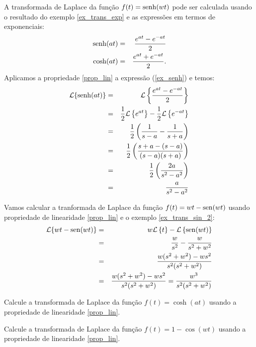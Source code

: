 \begin{ex} A transformada de Laplace da função $f(t)=\operatorname{senh}(wt)$ pode ser calculada usando o resultado do exemplo \ref{ex_trans_exp} e as expressões em termos de exponenciais:
\begin{eqnarray}
{\label{ex_senh}} \operatorname{senh}(at)&=&\frac{e^{at}-e^{-at}}{2}\\
{\label{ex_cosh}} \cosh(at)&=&\frac{e^{at}+e^{-at}}{2}.
\end{eqnarray} 
Aplicamos a propriedade \ref{prop_lin} a expressão (\ref{ex_senh}) e temos:
\begin{eqnarray*}
\mathcal{L }\{\operatorname{senh}(at)\}&=&\mathcal{L }\left\{\frac{e^{at}-e^{-at}}{2}\right\}\\
&=&\frac{1}{2} \mathcal{L }\left\{ e^{at}\right\}-\frac{1}{2} \mathcal{L }\left\{ e^{-at}\right\}\\
&=&\frac{1}{2}\left( \frac{1}{s-a}- \frac{1}{s+a}\right)\\
&=&\frac{1}{2}\left( \frac{s+a-(s-a)}{(s-a)(s+a)}\right)\\
&=&\frac{1}{2}\left( \frac{2a}{s^2-a^2}\right)\\
&=&\frac{a}{s^2-a^2}
\end{eqnarray*} 
\end{ex}

\begin{ex}Vamos calcular a tranformada de Laplace da função $f(t)=wt-\operatorname{sen}(wt)$ usando propriedade de linearidade \ref{prop_lin} e o exemplo \ref{ex_trans_sin_2}:
\begin{eqnarray*}
\mathcal{L }\{wt-\operatorname{sen}(wt)\}&=& w\mathcal{L }\left\{ t\right\}- \mathcal{L }\left\{ \operatorname{sen}(wt)\right\}\\
&=&\frac{w}{s^2}-\frac{w}{s^2+w^2}\\
&=&\frac{w(s^2+w^2)-ws^2}{s^2(s^2+w^2)}\\
&=&\frac{w(s^2+w^2)-ws^2}{s^2(s^2+w^2)}=\frac{w^3}{s^2(s^2+w^2)}\\
\end{eqnarray*} 
\end{ex}

\begin{prob}Calcule a transformada de Laplace da função $f(t)=\cosh(at)$ usando a propriedade de linearidade \ref{prop_lin}. 
\end{prob}
\begin{prob}Calcule a transformada de Laplace da função $f(t)=1-\cos(wt)$ usando a propriedade de linearidade \ref{prop_lin}. 
\end{prob}

